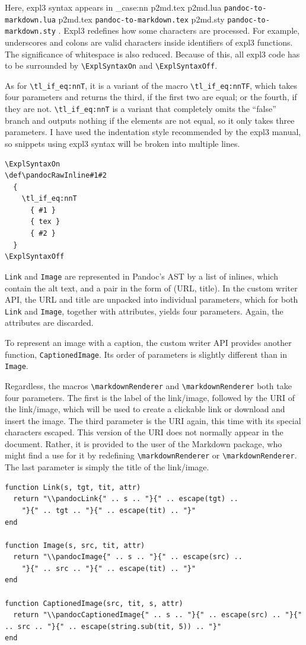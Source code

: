 \documentclass[
  digital,     %
  oneside,     %
  nosansbold,  %
  nocolorbold, %
  lof,         %
  nolot,       %
]{fithesis4}
\newcommand\macro[1]{\texttt{\textbackslash{}{#1}}}
\newcommand\renderer[1]{\macro{markdown\-Renderer\-{#1}}}
\newcommand\file[1]
  {
    \str_case:nn
      { #1 }
      {
        { p2md.lua } { \texttt{pandoc\hyp{}to\hyp{}markdown.lua} }
        { p2md.tex } { \texttt{pandoc\hyp{}to\hyp{}markdown.tex} }
        { p2md.sty } { \texttt{pandoc\hyp{}to\hyp{}markdown.sty} }
      }
  }
\begin{document}
Here, expl3 syntax appears in \file{p2md.tex}. Expl3 redefines how some characters are processed. For example, underscores and colons are valid characters inside identifiers of expl3 functions. The significance of whitespace is also reduced. Because of this, all expl3 code has to be surrounded by \macro{ExplSyntaxOn} and \macro{ExplSyntaxOff}.

As for \macro{tl\_if\_eq:nnT}, it is a variant of the macro \macro{tl\_if\_eq:nnTF}, which takes four parameters and returns the third, if the first two are equal; or the fourth, if they are not. \macro{tl\_if\_eq:nnT} is a variant that completely omits the ``false'' branch and outputs nothing if the elements are not equal, so it only takes three parameters. I have used the indentation style recommended by the expl3 manual, so snippets using expl3 syntax will be broken into multiple lines.

\noindent
\lstset{language=[plain]TeX}
\begin{lstlisting}
\ExplSyntaxOn
\def\pandocRawInline#1#2
  {
    \tl_if_eq:nnT
      { #1 }
      { tex }
      { #2 }
  }
\ExplSyntaxOff
\end{lstlisting}

\noindent
\texttt{Link} and \texttt{Image} are represented in Pandoc's AST by a list of inlines, which contain the alt text, and a pair in the form of (URL, title). In the custom writer API, the URL and title are unpacked into individual parameters, which for both \texttt{Link} and \texttt{Image}, together with attributes, yields four parameters. Again, the attributes are discarded.

To represent an image with a caption, the custom writer API provides another function, \texttt{CaptionedImage}. Its order of parameters is slightly different than in \texttt{Image}.

Regardless, the macros \renderer{Link} and \renderer{Image} both take four parameters. The first is the label of the link/image, followed by the URI of the link/image, which will be used to create a clickable link or download and insert the image. The third parameter is the URI again, this time with its special characters escaped. This version of the URI does not normally appear in the document. Rather, it is provided to the user of the Markdown package, who might find a use for it by redefining \renderer{Link} or \renderer{Image}.
The last parameter is simply the title of the link/image.

\noindent
\lstset{language=[5.3]Lua}
\begin{lstlisting}
function Link(s, tgt, tit, attr)
  return "\\pandocLink{" .. s .. "}{" .. escape(tgt) ..
    "}{" .. tgt .. "}{" .. escape(tit) .. "}"
end

function Image(s, src, tit, attr)
  return "\\pandocImage{" .. s .. "}{" .. escape(src) ..
    "}{" .. src .. "}{" .. escape(tit) .. "}"
end

function CaptionedImage(src, tit, s, attr)
  return "\\pandocCaptionedImage{" .. s .. "}{" .. escape(src) .. "}{" .. src .. "}{" .. escape(string.sub(tit, 5)) .. "}"
end
\end{lstlisting}
\end{document}
